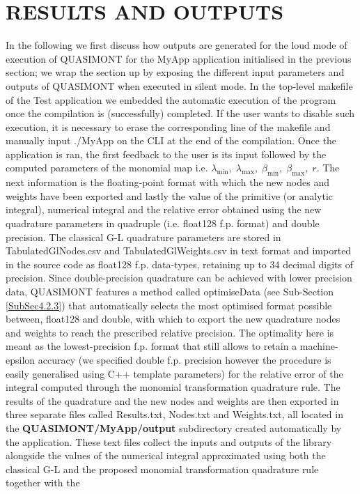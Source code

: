 \documentclass[a4paper, twosided]{book}
\begin{document}
\section[Results and outputs]{\changefont RESULTS AND OUTPUTS}\label{Sec3.2}

\noindent
In the following we first discuss how outputs are generated for the loud mode of execution of QUASIMONT for the \colorbox{poliGrayBlue}{MyApp} application initialised in the previous section; we wrap the section up by exposing the different input parameters and outputs of QUASIMONT when executed in silent mode. In the top-level \colorbox{poliGrayBlue}{makefile} of the \colorbox{poliGrayBlue}{Test} application we embedded the automatic execution of the program once the compilation is (successfully) completed. If the user wants to disable such execution, it is necessary to erase the corresponding line of the \colorbox{poliGrayBlue}{makefile} and manually input \colorbox{poliGrayBlue}{./MyApp} on the CLI at the end of the compilation. Once the application is ran, the first feedback to the user is its input followed by the computed parameters of the monomial map i.e. $\lambda_{\text{min}},\;\lambda_{\text{max}},\;\beta_{\text{min}},\;\beta_{\text{max}},\;r$. The next information is the floating-point format with which the new nodes and weights have been exported and lastly the value of the primitive (or analytic integral), numerical integral and the relative error obtained using the new quadrature parameters in quadruple (i.e. \colorbox{poliGrayBlue}{float128} f.p. format) and \colorbox{poliGrayBlue}{double} precision. The classical G-L quadrature parameters are stored in \colorbox{poliGrayBlue}{TabulatedGlNodes.csv} and \colorbox{poliGrayBlue}{TabulatedGlWeights.csv} in text format and imported in the source code as \colorbox{poliGrayBlue}{float128} f.p. data-types, retaining up to 34 decimal digits of precision. Since double-precision quadrature can be achieved with lower precision data, QUASIMONT features a method called \colorbox{poliGrayBlue}{optimiseData} (see Sub-Section \ref{SubSec4.2.3}) that automatically selects the most optimised format possible between, \colorbox{poliGrayBlue}{float128} and \colorbox{poliGrayBlue}{double}, with which to export the new quadrature nodes and weights to reach the prescribed relative precision. The optimality here is meant as the lowest-precision f.p. format that still allows to retain a machine-epsilon accuracy (we specified double f.p. precision however the procedure is easily generalised using C++ template parameters) for the relative error of the integral computed through the monomial  transformation quadrature rule. The results of the quadrature and the new nodes and weights are then exported in three separate files called \colorbox{poliGrayBlue}{Results.txt}, \colorbox{poliGrayBlue}{Nodes.txt} and \colorbox{poliGrayBlue}{Weights.txt}, all located in the \colorbox{poliGrayBlue}{\textbf{QUASIMONT/MyApp/output}} subdirectory created automatically by the application. These text files collect the inputs and outputs of the library alongside the values of the numerical integral approximated using both the classical G-L and the proposed monomial transformation quadrature rule together with the 
\end{document}
